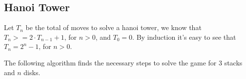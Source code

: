 \subsection{Hanoi Tower}

Let $T_n$ be the total of moves to solve a hanoi tower, we know that  $T_n >= 2 \cdot T_{n-1} + 1$, for $n > 0$, and $T_0 = 0$. By induction it's easy to see that $T_n = 2^n - 1$, for $n > 0$.

The following algorithm finds the necessary steps to solve the game for 3 stacks and $n$ disks.

